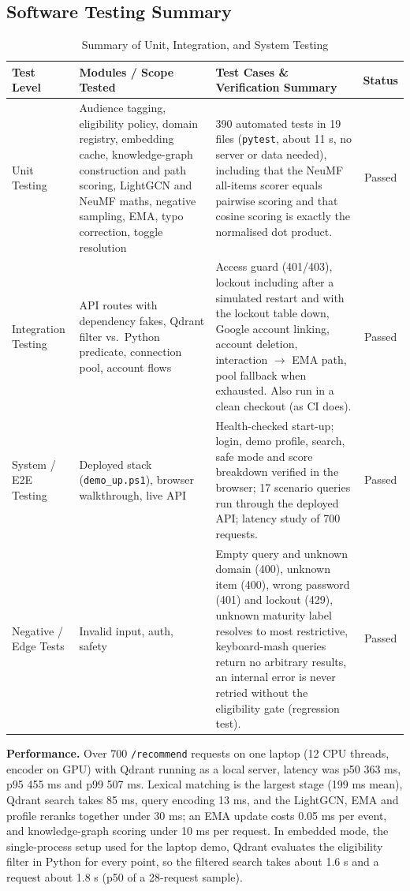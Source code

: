 \documentclass[11pt, a4paper]{article}
\begin{document}
\subsection{Software Testing Summary}
\begin{table}[H]
    \centering
    \footnotesize
    \renewcommand{\arraystretch}{1.25}
    \begin{tabular}{|L{2.6cm}|L{4.6cm}|L{6.6cm}|c|}
        \hline
        \textbf{Test Level} & \textbf{Modules / Scope Tested} & \textbf{Test Cases \& Verification Summary} & \textbf{Status} \\
        \hline
        Unit Testing & Audience tagging, eligibility policy, domain registry, embedding cache, knowledge-graph construction and path scoring, LightGCN and NeuMF maths, negative sampling, EMA, typo correction, toggle resolution & 390 automated tests in 19 files (\texttt{pytest}, about 11 s, no server or data needed), including that the NeuMF all-items scorer equals pairwise scoring and that cosine scoring is exactly the normalised dot product. & Passed \\
        \hline
        Integration Testing & API routes with dependency fakes, Qdrant filter vs.\ Python predicate, connection pool, account flows & Access guard (401/403), lockout including after a simulated restart and with the lockout table down, Google account linking, account deletion, interaction $\rightarrow$ EMA path, pool fallback when exhausted. Also run in a clean checkout (as CI does). & Passed \\
        \hline
        System / E2E Testing & Deployed stack (\texttt{demo\_up.ps1}), browser walkthrough, live API & Health-checked start-up; login, demo profile, search, safe mode and score breakdown verified in the browser; 17 scenario queries run through the deployed API; latency study of 700 requests. & Passed \\
        \hline
        Negative / Edge Tests & Invalid input, auth, safety & Empty query and unknown domain (400), unknown item (400), wrong password (401) and lockout (429), unknown maturity label resolves to most restrictive, keyboard-mash queries return no arbitrary results, an internal error is never retried without the eligibility gate (regression test). & Passed \\
        \hline
    \end{tabular}
    \caption{Summary of Unit, Integration, and System Testing}
\end{table}

\noindent\textbf{Performance.} Over 700 \texttt{/recommend} requests on one laptop (12 CPU threads, encoder on GPU) with Qdrant running as a local server, latency was p50 363 ms, p95 455 ms and p99 507 ms. Lexical matching is the largest stage (199 ms mean), Qdrant search takes 85 ms, query encoding 13 ms, and the LightGCN, EMA and profile reranks together under 30 ms; an EMA update costs 0.05 ms per event, and knowledge-graph scoring under 10 ms per request. In embedded mode, the single-process setup used for the laptop demo, Qdrant evaluates the eligibility filter in Python for every point, so the filtered search takes about 1.6 s and a request about 1.8 s (p50 of a 28-request sample).
\end{document}
